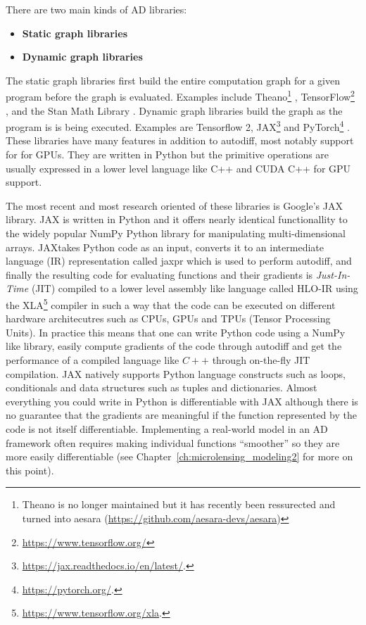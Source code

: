 \documentclass[12pt,dvipsnames]{report}
\newcommand{\ssf}[1]{\textsf{#1}}
\begin{document}
There are two main kinds of AD libraries:
\begin{itemize}
    \item \textbf{Static graph libraries} 
    \item \textbf{Dynamic graph libraries}
\end{itemize}
The static graph libraries first build the entire computation graph for a given program before 
the graph is evaluated. Examples include \ssf{Theano}\footnote{Theano is no longer 
maintained but it has recently been ressurected and turned into \ssf{aesara} 
(\url{https://github.com/aesara-devs/aesara})} \citep{arXiv:1605.02688}, 
\ssf{TensorFlow}\footnote{\url{https://www.tensorflow.org/}} \citep{arXiv:1603.04467}, 
and the \ssf{Stan Math Library} \citep{arXiv:1509.07164}.
Dynamic graph libraries build the graph as the program is is being executed. Examples are 
\ssf{Tensorflow 2}, \ssf{JAX}\footnote{\url{https://jax.readthedocs.io/en/latest/}.} 
\citep{jax2018github} and \ssf{PyTorch}\footnote{\url{https://pytorch.org/}.} \citep{pytorch}.
These libraries have many features in addition to autodiff, most notably support for
for GPUs. They are written in Python but the primitive operations are usually 
expressed in a lower level language like \ssf{C++} and \ssf{CUDA C++} 
for GPU support. 

The most recent and most research oriented of these libraries is Google's \ssf{JAX} 
library.
\ssf{JAX} is written in \ssf{Python} and it offers nearly identical functionallity 
to the widely popular \ssf{NumPy} \ssf{Python} library for manipulating 
multi-dimensional arrays. \ssf{JAX}takes Python code as an input, converts it 
to an intermediate language (IR) representation called \ssf{jaxpr} which is 
used to perform autodiff, and finally the resulting code for evaluating functions 
and their gradients is \textsl{Just-In-Time} (JIT) compiled to a lower level 
assembly like language called \ssf{HLO-IR} using the 
\ssf{XLA}\footnote{\url{https://www.tensorflow.org/xla}.} compiler in such a way 
that the code can be executed on different hardware architecutres such  as 
CPUs, GPUs and TPUs (Tensor Processing Units).
In practice this means that one can write \ssf{Python} code using a \ssf{NumPy} 
like library, easily compute gradients of the code through autodiff and get 
the performance of a compiled language like $C++$ through on-the-fly JIT 
compilation. \ssf{JAX} natively supports \ssf{Python} language constructs such 
as loops, conditionals and data structures such as tuples and dictionaries.
Almost everything you could write in \ssf{Python} is differentiable with 
\ssf{JAX} although there is no guarantee that the gradients are meaningful 
if the function represented by the code is not itself differentiable.
Implementing a real-world model in an AD framework often requires making individual 
functions ``smoother'' so they are more easily differentiable (see 
Chapter~\ref{ch:microlensing_modeling2} for more on this point).
\end{document}
